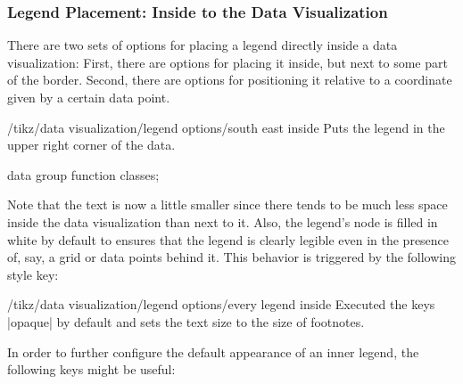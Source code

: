 \subsubsection{Legend Placement: Inside to the Data Visualization}
\label{section-dv-legend-inside}

There are two sets of options for placing a legend directly inside a data
visualization: First, there are options for placing it inside, but next to some
part of the border. Second, there are options for positioning it relative to a
coordinate given by a certain data point.

\begin{key}{/tikz/data visualization/legend options/south east inside}
    Puts the legend in the upper right corner of the data.
\begin{codeexample}[
    width=8cm,
    preamble={\usetikzlibrary{datavisualization.formats.functions}},
    pre={\tikz \datavisualization data group {function classes} = {
  data [set=log, format=function] {
    var x : interval [0.2:2.5];
    func y = ln(\value x);
  }
  data [set=lin, format=function] {
    var x : interval [-2:2.5];
    func y = 0.5*\value x;
  }
  data [set=squared, format=function] {
    var x : interval [-1.5:1.5];
    func y = \value x*\value x;
  }
  data [set=exp, format=function] {
    var x : interval [-2.5:1];
    func y = exp(\value x);
  }
};},
]
\tikz \datavisualization [
  scientific axes,
  visualize as smooth line/.list=
    {log, lin},
  legend=south east inside,
  log=    {label in legend={text=$\log x$}},
  lin=    {label in legend={text=$x/2$}},
  style sheet=strong colors]
data group {function classes};
\end{codeexample}

    Note that the text is now a little smaller since there tends to be much
    less space inside the data visualization than next to it. Also, the
    legend's node is filled in white by default to ensures that the legend is
    clearly legible even in the presence of, say, a grid or data points behind
    it. This behavior is triggered by the following style key:

    \begin{stylekey}{/tikz/data visualization/legend options/every legend inside}
        Executed the keys |opaque| by default and sets the text size to the
        size of footnotes.
    \end{stylekey}
\end{key}

In order to further configure the default appearance of an inner legend, the
following keys might be useful:

